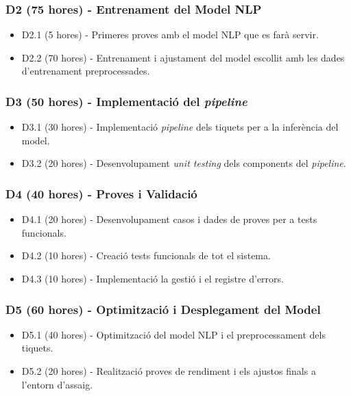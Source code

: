 \subsubsection{D2 (75 hores) - Entrenament del Model NLP}
\begin{itemize}
    \item D2.1 (5 hores) - Primeres proves amb el model NLP que es farà servir.
    \item D2.2 (70 hores) - Entrenament i ajustament del model escollit amb les dades d'entrenament preprocessades.
\end{itemize}

\subsubsection{D3 (50 hores) - Implementació del \textit{pipeline}}
\begin{itemize}
    \item D3.1 (30 hores) - Implementació \textit{pipeline} dels tiquets per a la inferència del model.
    \item D3.2 (20 hores) - Desenvolupament \textit{unit testing} dels components del \textit{pipeline}.
\end{itemize}

\subsubsection{D4 (40 hores) - Proves i Validació}
\begin{itemize}
    \item D4.1 (20 hores) - Desenvolupament casos i dades de proves per a tests funcionals.
    \item D4.2 (10 hores) - Creació tests funcionals de tot el sistema.
    \item D4.3 (10 hores) - Implementació la gestió i el registre d'errors.
\end{itemize}

\subsubsection{D5 (60 hores) - Optimització i Desplegament del Model}
\begin{itemize}
    \item D5.1 (40 hores) - Optimització del model NLP i el preprocessament dels tiquets.
    \item D5.2 (20 hores) - Realització proves de rendiment i els ajustos finals a l'entorn d'assaig.
\end{itemize}

